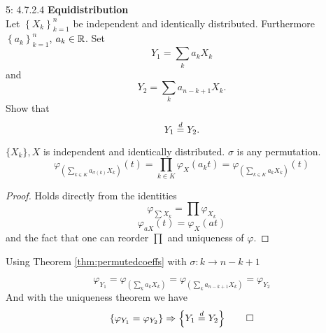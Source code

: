 \documentclass[a4paper,twoside=false,abstract=false,numbers=noenddot,
titlepage=false,headings=small,parskip=half,version=last]{scrartcl}
\begin{document}
\begin{exercise}{5: 4.7.2.4} \textbf{Equidistribution} \\
    Let $\left\{{X_k}\right\}_{k=1}^n$ be independent and identically
    distributed. Furthermore $\left\{{a_k}\right\}_{k=1}^n$, $a_k \in \mathbb{R}$. Set
    \begin{equation}
        Y_1 = \sum\limits_k a_k X_k
    \end{equation}
    and
    \begin{equation}
        Y_2 = \sum\limits_k a_{n-k+1} X_k.
    \end{equation}
    Show that
    \begin{equation}
        Y_1 \stackrel{d}{=} Y_2.
    \end{equation}
\end{exercise}
\begin{solution}

    \begin{identity}
        \label{thm:permutedcoeffs}
        $\{X_k\}, X$ is independent and identically distributed.
        $\sigma$ is any permutation.
        \begin{equation}
            \varphi_{\left(\sum\limits_{k\in K}a_{\sigma(k)} X_k\right)}(t) =
            \prod\limits_{k\in K} \varphi_X (a_k t) =
            \varphi_{\left(\sum\limits_{k\in K}a_{k} X_k\right)}(t)
        \end{equation}
    \end{identity}
    \begin{proof}
        Holds directly from the identities
        \begin{equation}
            \varphi_{\sum X_k} = \prod \varphi_{X_k}
        \end{equation}
        \begin{equation}
            \varphi_{a X}(t) = \varphi_{X}(at)
        \end{equation}
        and the fact that one can reorder $\prod$ and uniqueness of $\varphi$.

    \end{proof}

    Using Theorem \ref{thm:permutedcoeffs} with
    $\sigma: k\rightarrow n-k+1$

    \begin{equation}
        \varphi_{Y_1} =
        \varphi_{\left(\sum\limits_k a_k X_k\right)} =
        \varphi_{\left(\sum\limits_k a_{n-k+1} X_k\right)} =
        \varphi_{Y_2}
    \end{equation}
    And with the uniqueness theorem we have
    \begin{equation}
        \left\{\varphi_{Y_1} = \varphi_{Y_2}\right\} \Rightarrow
        \left\{Y_1 \stackrel{d}{=} Y_2\right\} \qed
    \end{equation}
\end{solution}
\pagebreak
\end{document}
